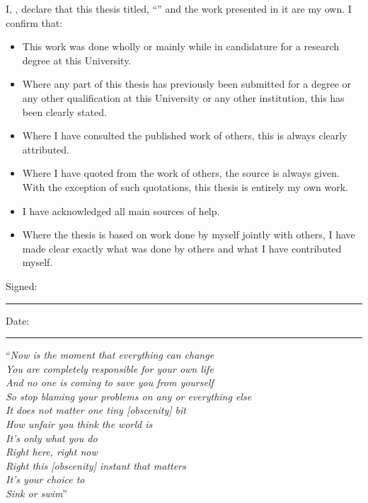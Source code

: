 \documentclass[
11pt, %
english, %
singlespacing, %
headsepline, %
]{MastersDoctoralThesis} %
\begin{document}

\begin{declaration}
\addchaptertocentry{\authorshipname} %
\noindent I, \authorname, declare that this thesis titled, \enquote{\ttitle} and the work presented in it are my own. I confirm that:

\begin{itemize} 
\item This work was done wholly or mainly while in candidature for a research degree at this University.
\item Where any part of this thesis has previously been submitted for a degree or any other qualification at this University or any other institution, this has been clearly stated.
\item Where I have consulted the published work of others, this is always clearly attributed.
\item Where I have quoted from the work of others, the source is always given. With the exception of such quotations, this thesis is entirely my own work.
\item I have acknowledged all main sources of help.
\item Where the thesis is based on work done by myself jointly with others, I have made clear exactly what was done by others and what I have contributed myself.
\end{itemize}
 
\noindent Signed:\\
\rule[0.5em]{25em}{0.5pt} %
 
\noindent Date:\\
\rule[0.5em]{25em}{0.5pt} %
\end{declaration}

\cleardoublepage


\vspace*{0.2\textheight}

\noindent\enquote{\itshape Now is the moment that everything can change\\
You are completely responsible for your own life\\
And no one is coming to save you from yourself\\
So stop blaming your problems on any or everything else\\
It does not matter one tiny [obscenity] bit\\
How unfair you think the world is\\
It's only what you do\\
Right here, right now\\
Right this [obscenity] instant that matters\\
It's your choice to\\
Sink or swim}\bigbreak
\end{document}
